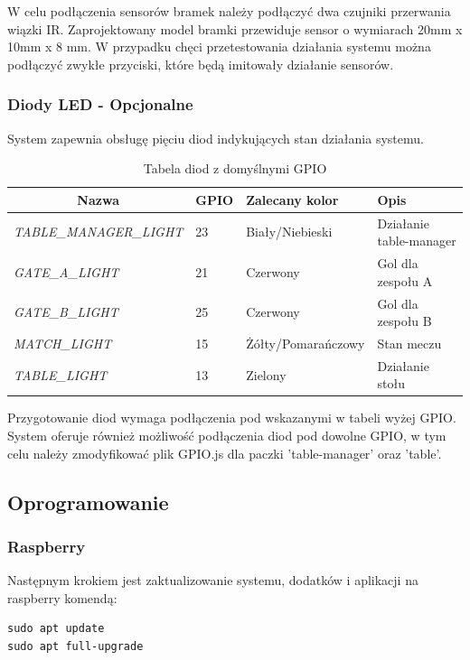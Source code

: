 W celu podłączenia sensorów bramek należy podłączyć dwa czujniki przerwania wiązki IR. Zaprojektowany model bramki przewiduje sensor o wymiarach 20mm x 10mm x 8 mm. W przypadku chęci przetestowania działania systemu można podłączyć zwykłe przyciski, które będą imitowały działanie sensorów.

\subsubsection{Diody LED - Opcjonalne}
System zapewnia obsługę pięciu diod indykujących stan działania systemu.

\begin{table}[h!]
\centering
\begin{tabular}{|l|l|l|l|}
\hline
\multicolumn{1}{|c|}{\textbf{Nazwa}} & \multicolumn{1}{c|}{\textbf{GPIO}} & \textbf{Zalecany kolor} & \textbf{Opis} \\ \hline
\textit{TABLE\_MANAGER\_LIGHT} & 23 & Biały/Niebieski & Działanie table-manager \\ \hline
\textit{GATE\_A\_LIGHT} & 21 & Czerwony & Gol dla zespołu A \\ \hline
\textit{GATE\_B\_LIGHT} & 25 & Czerwony & Gol dla zespołu B \\ \hline
\textit{MATCH\_LIGHT} & 15 & Żółty/Pomarańczowy & Stan meczu \\ \hline
\textit{TABLE\_LIGHT} & 13 & Zielony & Działanie stołu \\ \hline
\end{tabular}
\caption{Tabela diod z domyślnymi GPIO}
\end{table}

Przygotowanie diod wymaga podłączenia pod wskazanymi w tabeli wyżej GPIO. System oferuje również możliwość podłączenia diod pod dowolne GPIO,  w tym celu należy zmodyfikować plik GPIO.js dla paczki 'table-manager' oraz 'table'.

\subsection{Oprogramowanie}

\subsubsection{Raspberry}

Następnym krokiem jest zaktualizowanie systemu, dodatków i aplikacji na raspberry komendą:

\begin{lstlisting}
sudo apt update
sudo apt full-upgrade
\end{lstlisting}

